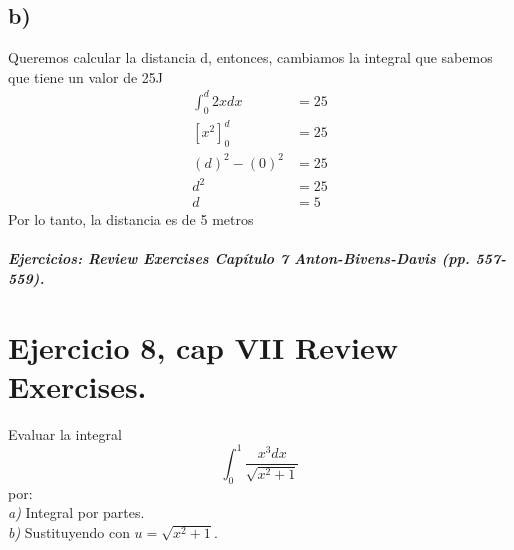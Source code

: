 \documentclass[11pt,letterpaper]{article}
\begin{document}
\subsection*{b)}
Queremos calcular la distancia d, entonces, cambiamos la integral que sabemos que tiene un valor de 25J
\begin{equation*}
  \begin{split}
    \int_{0}^{d}2xdx &= 25\\
        [x^2]_{0}^{d} &=25\\
        (d)^2-(0)^2 &=25\\
        d^2 &=25\\
        d&=5
  \end{split}
\end{equation*}
Por lo tanto, la distancia es de 5 metros

\subparagraph{Ejercicios: Review Exercises Capítulo 7 Anton-Bivens-Davis (pp. 557-559).}

\section{Ejercicio 8, cap VII Review Exercises.}
Evaluar la integral
\begin{equation*}
  \int_{0}^{1} \frac{x^3dx}{\sqrt{x^2+1}}
\end{equation*}
por:\\
\textit{a)} Integral por partes.\\
\textit{b)} Sustituyendo con $u=\sqrt{x^2+1}$.
\end{document}
